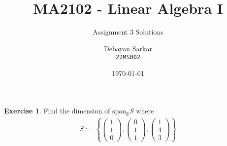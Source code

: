 \documentclass[10pt]{scrartcl}
\title{MA2102 - Linear Algebra I}
\subtitle{Assignment 3 Solutions}
\author{Debayan Sarkar \\ \texttt{22MS002}}
\date{\today}
\theoremstyle{definition}
\newtheorem{exercise}{Exercise}
\begin{document}
\maketitle
\begin{exercise}
    Find the dimension of $\text{span}_{\mathbb{R}}S$ where 
    \begin{gather*}
        S := \left\{
        \begin{pmatrix}
            1 \\
            1 \\
            0 
        \end{pmatrix}
        ,
        \begin{pmatrix}
            0 \\
            1 \\
            1 
        \end{pmatrix}
        ,
        \begin{pmatrix}
            1 \\
            4 \\
            3 
        \end{pmatrix}
        \right\}
    \end{gather*}
\end{exercise}
\end{document}
